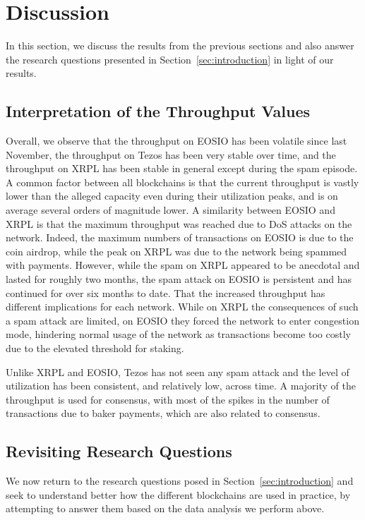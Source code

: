 \section{Discussion}
\label{sec:discussion}
In this section, we discuss the results from the previous sections and also answer the research questions presented in Section~\ref{sec:introduction} in light of our results.


\subsection{Interpretation of the Throughput Values}
Overall, we observe that the throughput on EOSIO has been volatile since last November, the throughput on Tezos has been very stable over time, and the throughput on XRPL has been stable in general except during the spam episode.
A common factor between all blockchains is that the current throughput is vastly lower than the alleged capacity even during their utilization peaks, and is on average several orders of magnitude lower.
A similarity between EOSIO and XRPL is that the maximum throughput was reached due to DoS attacks on the network. Indeed, the maximum numbers of transactions on EOSIO is due to the  coin airdrop, while the peak on XRPL was due to the network being spammed with payments.
However, while the spam on XRPL appeared to be anecdotal and lasted for roughly two months, the spam attack on EOSIO is persistent and has continued for over six months to date.
That the increased throughput has different implications for each network.
While on XRPL the consequences of such a spam attack are limited, on EOSIO they forced the network to enter congestion mode, hindering normal usage of the network as transactions become too costly due to the elevated threshold for staking.

Unlike XRPL and EOSIO, Tezos has not seen any spam attack and the level of utilization has been consistent, and relatively low, across time. A majority of the throughput is used for consensus, with most of the spikes in the number of transactions due to baker payments, which are also related to consensus.

\subsection{Revisiting Research Questions}
We now return to the research questions posed in Section~\ref{sec:introduction} and seek to understand better how the different blockchains are used in practice, by attempting to answer them based on the data analysis we perform above.

